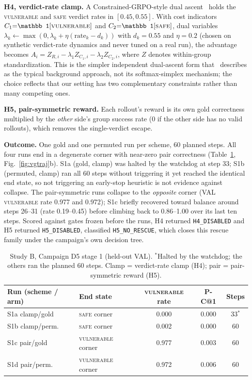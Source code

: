 \documentclass[journal]{IEEEtran}
\makeatletter
\newcommand{\vuln}{\textsc{vulnerable}}
\newcommand{\safe}{\textsc{safe}}
\newcommand{\pc}{P-C@1}
\makeatother
\begin{document}
\textbf{H4, verdict-rate clamp.} A Constrained-GRPO-style dual ascent~\cite{constrained} holds the \vuln{} and \safe{} verdict rates in $[0.45,0.55]$. With cost indicators $C_1{=}\mathbb 1[\vuln]$ and $C_2{=}\mathbb 1[\safe]$, dual variables $\lambda_k\leftarrow\max(0,\lambda_k+\eta(\text{rate}_k-d_k))$ with $d_k{=}0.55$ and $\eta{=}0.2$ (chosen on synthetic verdict-rate dynamics and never tuned on a real run), the advantage becomes $A_i=Z_{R,i}-\lambda_1 Z_{C_1,i}-\lambda_2 Z_{C_2,i}$, where $Z$ denotes within-group standardization. This is the simpler independent dual-ascent form that~\cite{constrained} describes as the typical background approach, not its softmax-simplex mechanism; the choice reflects that our setting has two complementary constraints rather than many competing ones.

\textbf{H5, pair-symmetric reward.} Each rollout's reward is its own gold correctness multiplied by the \emph{other} side's group success rate (0 if the other side has no valid rollouts), which removes the single-verdict escape.

\textbf{Outcome.} One gold and one permuted run per scheme, 60 planned steps. All four runs end in a degenerate corner with near-zero pair correctness (Table~\ref{tab:d5}, Fig.~\ref{fig:vgtraj}b). S1a (gold, clamp) was halted by the watchdog at step 33; S1b (permuted, clamp) ran all 60 steps without triggering it yet reached the identical end state, so not triggering an early-stop heuristic is not evidence against collapse. The pair-symmetric runs collapse to the \emph{opposite} corner (VAL \vuln{} rate 0.977 and 0.972); S1c briefly recovered toward balance around steps 26--31 (rate 0.19--0.45) before climbing back to 0.86--1.00 over its last ten steps. Scored against gates frozen before the runs, H4 returned \texttt{H4\_DISABLED} and H5 returned \texttt{H5\_DISABLED}, classified \texttt{H5\_NO\_RESCUE}, which closes this rescue family under the campaign's own decision tree.

\begin{table}[t]
\centering\scriptsize\setlength{\tabcolsep}{2.5pt}
\caption{Study B, Campaign D5 stage 1 (held-out VAL). $^{*}$Halted by the watchdog; the others ran the planned 60 steps. Clamp = verdict-rate clamp (H4); pair = pair-symmetric reward (H5).}
\label{tab:d5}
\begin{tabular}{llccc}
\toprule
Run (scheme / arm) & End state & \vuln{} rate & \pc{} & Steps\\
\midrule
S1a clamp/gold & \safe{} corner & 0.000 & 0.000 & 33$^{*}$\\
S1b clamp/perm. & \safe{} corner & 0.002 & 0.000 & 60\\
S1c pair/gold & \vuln{} corner & 0.977 & 0.003 & 60\\
S1d pair/perm. & \vuln{} corner & 0.972 & 0.006 & 60\\
\bottomrule
\end{tabular}
\end{table}
\end{document}
